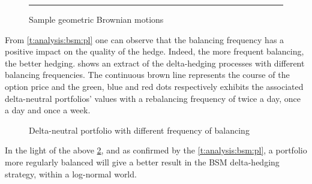 \documentclass[12pt]{report}
\begin{document}
\begin{figure}[ht]
  \centering
  \rule{40mm}{20mm}
  \caption{Sample geometric Brownian motions}
  \label{p:analysis:gbm:100}
\end{figure}



















From \cref{t:analysis:bsm:pl} one can observe that the balancing frequency has a positive impact on the quality of the hedge.
Indeed, the more frequent balancing, the better hedging.
 shows an extract of the delta-hedging processes with different balancing frequencies.
The continuous brown line represents the course of the option price and the green, blue and red dots respectively exhibits the associated delta-neutral portfolios' values with a rebalancing frequency of twice a day, once a day and once a week.


\begin{figure}[h]
  \centering
  
  \caption{Delta-neutral portfolio with different frequency of balancing}
  \label{p:analysis:gbm:hedges}
\end{figure}

In the light of the above \cref{p:analysis:gbm:hedges}, and as confirmed by the \cref{t:analysis:bsm:pl}, a portfolio more regularly balanced will give a better result in the BSM delta-hedging strategy, within a log-normal world.
    
\end{document}

